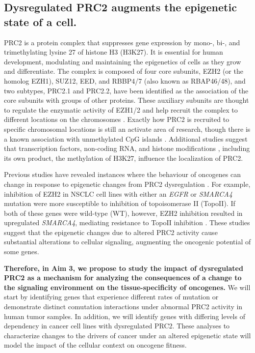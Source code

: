 \subsection*{Dysregulated PRC2 augments the epigenetic state of a cell.}

PRC2 is a protein complex that suppresses gene expression by mono-, bi-, and trimethylating lysine 27 of histone H3 (H3K27).
It is essential for human development, modulating and maintaining the epigenetics of cells as they grow and differentiate.
The complex is composed of four core subunits, EZH2 (or the homolog EZH1), SUZ12, EED, and RBBP4/7 (also known as RBAP46/48), and two subtypes, PRC2.1 and  PRC2.2, have been identified as the association of the core subunits with groups of other proteins.
These auxiliary subunits are thought to regulate the enzymatic activity of EZH1/2 and help recruit the complex to different locations on the chromosomes \cite{VanMierlo2019a, Laugesen2019a}.
Exactly how PRC2 is recruited to specific chromosomal locations is still an activate area of research, though there is a known association with unmethylated CpG islands  \cite{Ku2008, Tanay2007HyperconservedSites., Mendenhall2010GC-richCells., Lynch2012AnRecruitment.}.
Additional studies suggest that transcription factors, non-coding RNA, and histone modifications \cite{Laugesen2019a}, including its own product, the methylation of H3K27, influence the localization of PRC2.

Previous studies have revealed instances where the behaviour of oncogenes can change in response to epigenetic changes from PRC2 dysregulation \cite{Kim2015SWI/SNF-mutantEZH2., Fillmore2015EZH2Inhibitors., Serresi2016PolycombCancer., Serresi2018Ezh2Vulnerabilities., Chen2018TargetingMedicine.}.
For example, inhibition of EZH2 in NSCLC cell lines with either an \emph{EGFR} or \emph{SMARCA4} mutation were more susceptible to inhibition of topoisomerase II (TopoII).
If both of these genes were wild-type (WT), however, EZH2 inhibition resulted in upregulated \emph{SMARCA4}, mediating resistance to TopoII inhibition \cite{Fillmore2015EZH2Inhibitors.}.
These studies suggest that the epigenetic changes due to altered PRC2 activity cause substantial alterations to cellular signaling, augmenting the oncogenic potential of some genes.

\textbf{Therefore, in Aim 3, we propose to study the impact of dysregulated PRC2 as a mechanism for analyzing the consequences of a change to the signaling environment on the tissue-specificity of oncogenes.}
We will start by identifying genes that experience different rates of mutation or demonstrate distinct comutation interactions under abnormal PRC2 activity in human tumor samples.
In addition, we will identify genes with differing levels of dependency in cancer cell lines with dysregulated PRC2.
These analyses to characterize changes to the drivers of cancer under an altered epigenetic state will model the impact of the cellular context on oncogene fitness.
